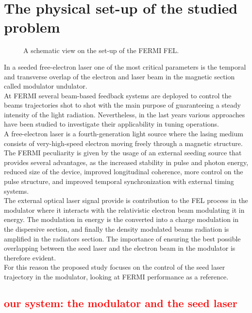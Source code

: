 \documentclass[
 reprint,
 amsmath,amssymb,amsfonts,clevref,
 aps,
prstab,
]{revtex4-2}
\newcommand{\NB}[1]{\textcolor{red}{#1}}
\begin{document}
\section{The physical set-up of the studied problem}
\begin{figure}[!h]
	\centering
	
	\caption{A schematic view on the set-up of the FERMI FEL.}
	\label{fig:schematic_FEL}
\end{figure}
In a seeded free-electron laser one of the most critical parameters is the temporal and transverse overlap of the electron and laser beam in the magnetic section called modulator undulator.\\
At FERMI several beam-based feedback systems are deployed to control the beams trajectories shot to shot with the main purpose of guaranteeing a steady intensity of the light radiation. Nevertheless, in the last years various approaches have been studied to investigate their applicability in tuning operations. \\
A free-electron laser is a fourth-generation light source where the lasing medium consists of very-high-speed electron moving freely through a magnetic structure. The FERMI peculiarity is given by the usage of an external seeding source that provides several advantages, as the increased stability in pulse and photon energy, reduced size of the device, improved longitudinal coherence, more control on the pulse structure, and improved temporal synchronization with external timing systems.\\
The external optical laser signal provide is contribution to the FEL process in the modulator where it interacts with the relativistic electron beam modulating it in energy. The modulation in energy is the converted into a charge modulation in the dispersive section, and finally the density modulated beams radiation is amplified in the radiators section. The importance of ensuring the best possible overlapping between the seed laser and the electron beam in the modulator is therefore evident.\\
For this reason the proposed study focuses on the control of the seed laser trajectory in the modulator, looking at FERMI performance as a reference.
\subsection{\NB{our system: the modulator and the seed laser}}
\end{document}
